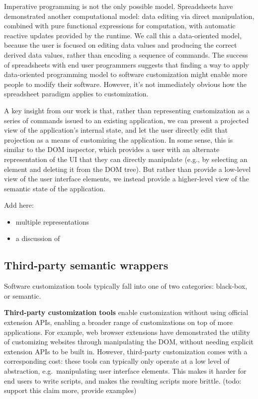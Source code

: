 \documentclass[sigplan,10pt,anonymous,review]{acmart}
\providecommand{\tightlist}{%
  \setlength{\itemsep}{0pt}\setlength{\parskip}{0pt}}
\begin{document}
Imperative programming is not the only possible model. Spreadsheets have
demonstrated another computational model: data editing via direct
manipulation, combined with pure functional expressions for computation,
with automatic reactive updates provided by the runtime. We call this a
data-oriented model, because the user is focused on editing data values
and producing the correct derived data values, rather than encoding a
sequence of commands. The success of spreadsheets with end user
programmers suggests that finding a way to apply data-oriented
programming model to software customization might enable more people to
modify their software. However, it's not immediately obvious how the
spreadsheet paradigm applies to customization.

A key insight from our work is that, rather than representing
customization as a series of commands issued to an existing application,
we can present a projected view of the application's internal state, and
let the user directly edit that projection as a means of customizing the
application. In some sense, this is similar to the DOM inspector, which
provides a user with an alternate representation of the UI that they can
directly manipulate (e.g., by selecting an element and deleting it from
the DOM tree). But rather than provide a low-level view of the user
interface elements, we instead provide a higher-level view of the
semantic state of the application.

Add here:

\begin{itemize}
\tightlist
\item
  multiple representations
\item
  a discussion of
\end{itemize}

\hypertarget{third-party-semantic-wrappers}{%
\subsection{Third-party semantic
wrappers}\label{third-party-semantic-wrappers}}

Software customization tools typically fall into one of two categories:
black-box, or semantic.

\textbf{Third-party customization tools} enable customization without
using official extension APIs, enabling a broader range of
customizations on top of more applications. For example, web browser
extensions have demonstrated the utility of customizing websites through
manipulating the DOM, without needing explicit extension APIs to be
built in. However, third-party customization comes with a corresponding
cost: these tools can typically only operate at a low level of
abstraction, e.g.~manipulating user interface elements. This makes it
harder for end users to write scripts, and makes the resulting scripts
more brittle. (todo: support this claim more, provide examples)
\end{document}
